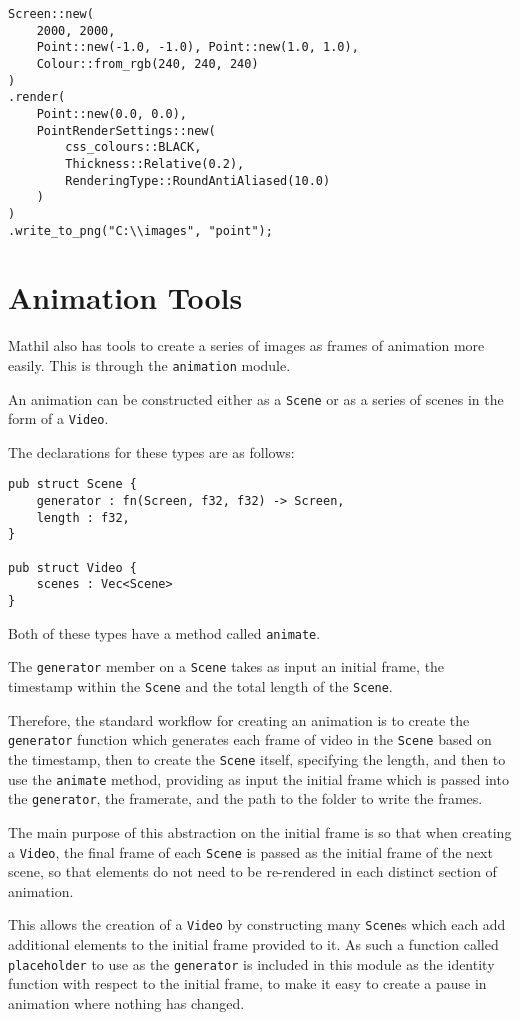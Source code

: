 \begin{lstlisting}
Screen::new(
    2000, 2000,
    Point::new(-1.0, -1.0), Point::new(1.0, 1.0),
    Colour::from_rgb(240, 240, 240)
)
.render(
    Point::new(0.0, 0.0),
    PointRenderSettings::new(
        css_colours::BLACK,
        Thickness::Relative(0.2),
        RenderingType::RoundAntiAliased(10.0)
    )
)
.write_to_png("C:\\images", "point");
\end{lstlisting}

\section{Animation Tools}

Mathil also has tools to create a series of images as frames of animation more easily. This is through the \verb|animation| module.

An animation can be constructed either as a \verb|Scene| or as a series of scenes in the form of a \verb|Video|.

The declarations for these types are as follows:

\begin{lstlisting}
pub struct Scene {
    generator : fn(Screen, f32, f32) -> Screen,
    length : f32,
}

pub struct Video {
    scenes : Vec<Scene>
}
\end{lstlisting}

Both of these types have a method called \verb|animate|.

The \verb|generator| member on a \verb|Scene| takes as input an initial frame, the timestamp within the \verb|Scene| and the total length of the \verb|Scene|.

Therefore, the standard workflow for creating an animation is to create the \verb|generator| function which generates each frame of video in the \verb|Scene| based on the timestamp, then to create the \verb|Scene| itself, specifying the length, and then to use the \verb|animate| method, providing as input the initial frame which is passed into the \verb|generator|, the framerate, and the path to the folder to write the frames.

The main purpose of this abstraction on the initial frame is so that when creating a \verb|Video|, the final frame of each \verb|Scene| is passed as the initial frame of the next scene, so that elements do not need to be re-rendered in each distinct section of animation.

This allows the creation of a \verb|Video| by constructing many \verb|Scene|s which each add additional elements to the initial frame provided to it. As such a function called \verb|placeholder| to use as the \verb|generator| is included in this module as the identity function with respect to the initial frame, to make it easy to create a pause in animation where nothing has changed.

